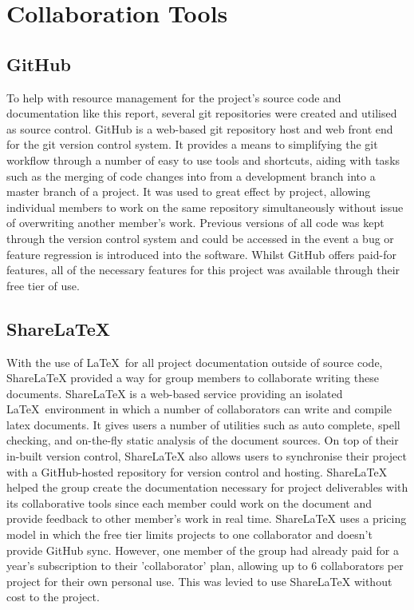 \section{Collaboration Tools}
    \subsection{GitHub}
    
        To help with resource management for the project's source code and documentation like this report, several git repositories were created and utilised as source control. GitHub is a web-based git repository host and web front end for the git version control system. It provides a means to simplifying the git workflow through a number of easy to use tools and shortcuts, aiding with tasks such as the merging of code changes into from a development branch into a master branch of a project. It was used to great effect by project, allowing individual members to work on the same repository simultaneously without issue of overwriting another member's work. Previous versions of all code was kept through the version control system and could be accessed in the event a bug or feature regression is introduced into the software. Whilst GitHub offers paid-for features, all of the necessary features for this project was available through their free tier of use.
    
    \subsection{ShareLaTeX}
    
        With the use of \LaTeX~for all project documentation outside of source code, ShareLaTeX provided a way for group members to collaborate writing these documents. ShareLaTeX is a web-based service providing an isolated \LaTeX~environment in which a number of collaborators can write and compile latex documents. It gives users a number of utilities such as auto complete, spell checking, and on-the-fly static analysis of the document sources. On top of their in-built version control, ShareLaTeX also allows users to synchronise their project with a GitHub-hosted repository for version control and hosting. ShareLaTeX helped the group create the documentation necessary for project deliverables with its collaborative tools since each member could work on the document and provide feedback to other member's work in real time. ShareLaTeX uses a pricing model in which the free tier limits projects to one collaborator and doesn't provide GitHub sync. However, one member of the group had already paid for a year's subscription to their 'collaborator' plan, allowing up to 6 collaborators per project for their own personal use. This was levied to use ShareLaTeX without cost to the project.
    
